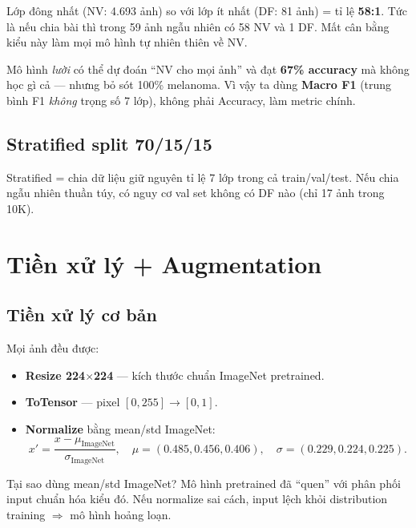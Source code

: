 \documentclass[11pt,a4paper]{article}
\begin{document}
\begin{simple}
Lớp đông nhất (NV: 4.693 ảnh) so với lớp ít nhất (DF: 81 ảnh) = tỉ lệ \textbf{58:1}. Tức là nếu chia bài thì trong 59 ảnh ngẫu nhiên có 58 NV và 1 DF. Mất cân bằng kiểu này làm mọi mô hình tự nhiên thiên về NV.
\end{simple}

\begin{idea}
Mô hình \textit{lười} có thể dự đoán ``NV cho mọi ảnh'' và đạt \textbf{67\% accuracy} mà không học gì cả --- nhưng bỏ sót 100\% melanoma. Vì vậy ta dùng \textbf{Macro F1} (trung bình F1 \textit{không} trọng số 7 lớp), không phải Accuracy, làm metric chính.
\end{idea}

\subsection{Stratified split 70/15/15}

\begin{simple}
Stratified = chia dữ liệu giữ nguyên tỉ lệ 7 lớp trong cả train/val/test. Nếu chia ngẫu nhiên thuần túy, có nguy cơ val set không có DF nào (chỉ 17 ảnh trong 10K).
\end{simple}

\section{Tiền xử lý + Augmentation}

\subsection{Tiền xử lý cơ bản}

Mọi ảnh đều được:
\begin{itemize}[leftmargin=*]
  \item \textbf{Resize 224$\times$224} --- kích thước chuẩn ImageNet pretrained.
  \item \textbf{ToTensor} --- pixel $[0, 255] \to [0, 1]$.
  \item \textbf{Normalize} bằng mean/std ImageNet:
  \[
    x' = \frac{x - \mu_{\text{ImageNet}}}{\sigma_{\text{ImageNet}}}, \quad
    \mu = (0.485, 0.456, 0.406), \quad \sigma = (0.229, 0.224, 0.225).
  \]
\end{itemize}

\begin{simple}
Tại sao dùng mean/std ImageNet? Mô hình pretrained đã ``quen'' với phân phối input chuẩn hóa kiểu đó. Nếu normalize sai cách, input lệch khỏi distribution training $\Rightarrow$ mô hình hoảng loạn.
\end{simple}
\end{document}
